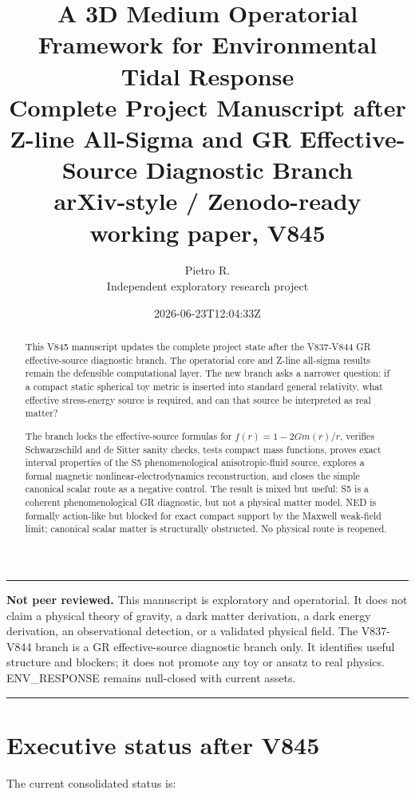 \documentclass[11pt,a4paper]{article}
\title{\textbf{A 3D Medium Operatorial Framework for Environmental Tidal Response}\\
\large Complete Project Manuscript after Z-line All-Sigma and GR Effective-Source Diagnostic Branch\\
\large arXiv-style / Zenodo-ready working paper, V845}
\author{Pietro R.\\Independent exploratory research project}
\date{2026-06-23T12:04:33Z}
\newcommand{\warningbox}[1]{\begin{center}\begin{minipage}{0.93\linewidth}\color{red!60!black}\hrule\vspace{0.5em}\color{black}#1\vspace{0.5em}\color{red!60!black}\hrule\end{minipage}\end{center}}
\begin{document}
\maketitle

\warningbox{\textbf{Not peer reviewed.} This manuscript is exploratory and operatorial. It does not claim a physical theory of gravity, a dark matter derivation, a dark energy derivation, an observational detection, or a validated physical field. The V837-V844 branch is a GR effective-source diagnostic branch only. It identifies useful structure and blockers; it does not promote any toy or ansatz to real physics. ENV\_RESPONSE remains null-closed with current assets.}

\begin{abstract}
This V845 manuscript updates the complete project state after the V837-V844 GR effective-source diagnostic branch. The operatorial core and Z-line all-sigma results remain the defensible computational layer. The new branch asks a narrower question: if a compact static spherical toy metric is inserted into standard general relativity, what effective stress-energy source is required, and can that source be interpreted as real matter?

The branch locks the effective-source formulas for $f(r)=1-2Gm(r)/r$, verifies Schwarzschild and de Sitter sanity checks, tests compact mass functions, proves exact interval properties of the S5 phenomenological anisotropic-fluid source, explores a formal magnetic nonlinear-electrodynamics reconstruction, and closes the simple canonical scalar route as a negative control. The result is mixed but useful: S5 is a coherent phenomenological GR diagnostic, but not a physical matter model. NED is formally action-like but blocked for exact compact support by the Maxwell weak-field limit; canonical scalar matter is structurally obstructed. No physical route is reopened.
\end{abstract}

\tableofcontents
\newpage

\section{Executive status after V845}

The current consolidated status is:
\end{document}
